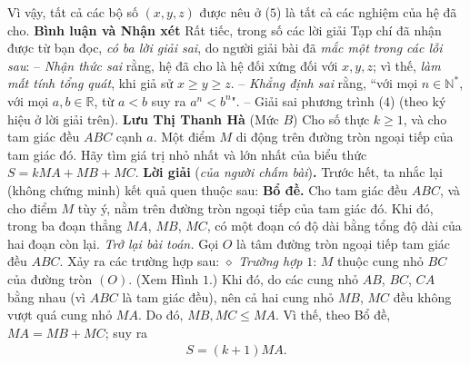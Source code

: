 \begin{multicols}{2}
	\vskip 0.05cm
	Vì vậy, tất cả các bộ số $(x, y, z)$ được nêu ở ($5$) là tất cả các nghiệm của hệ đã cho.
	\vskip 0.05cm
	\textbf{\color{thachthuctoanhoc}Bình luận và Nhận xét}
	\vskip 0.05cm
	Rất tiếc, trong số các lời giải Tạp chí đã nhận được từ bạn đọc, \textit{có ba lời giải sai}, do người giải bài đã \textit{mắc một trong các lỗi sau}:
	\vskip 0.05cm
	-- \textit{Nhận thức sai} rằng, hệ đã cho là hệ đối xứng đối với $x, y, z$; vì thế, \textit{làm mất tính tổng quát}, khi giả sử $x \ge y \ge z$.
	\vskip 0.05cm
	-- \textit{Khẳng định sai} rằng, ``với mọi $n \in \mathbb{N^*}$, với mọi $a,b \in \mathbb{R}$, từ $a < b$ suy ra $a^n < b^n$".
	\vskip 0.05cm
	-- Giải sai phương trình ($4$) (theo ký hiệu ở lời giải trên).
	\vskip 0.05cm
	\hfill \textbf{\color{thachthuctoanhoc}Lưu Thị Thanh Hà}
	\vskip 0.05cm
	{}
	(Mức $B$) Cho số thực $k\ge1$, và cho tam giác đều $ABC$ cạnh $a$. Một điểm $M$ di động trên đường tròn ngoại tiếp của tam giác đó. Hãy tìm giá trị nhỏ nhất và lớn nhất của biểu thức $S=kMA+MB+MC$.
	\vskip 0.05cm
	\textbf{\color{thachthuctoanhoc}Lời giải} (\textit{của người chấm bài})\textbf{\color{thachthuctoanhoc}.}
	\vskip 0.05cm
	Trước hết, ta nhắc lại (không chứng minh) kết quả quen thuộc sau:
	\vskip 0.05cm
	\textbf{\color{thachthuctoanhoc}Bổ đề.} Cho tam giác đều $ABC$, và cho điểm $M$ tùy ý, nằm trên đường tròn ngoại tiếp của tam giác đó. Khi đó, trong ba đoạn thẳng $MA$, $MB$, $MC$, có một đoạn có độ dài bằng tổng độ dài của hai đoạn còn lại.
	\vskip 0.05cm
	\textit{Trở lại bài toán.}
	\vskip 0.05cm
	Gọi $O$ là tâm đường tròn ngoại tiếp tam giác đều $ABC$. Xảy ra các trường hợp sau:
	\vskip 0.05cm
	$\diamond$ \textit{Trường hợp} $1$: $M$ thuộc cung nhỏ $BC$ của đường tròn $(O)$. (Xem Hình $1$.)
	\vskip 0.05cm
	Khi đó, do các cung nhỏ $AB$, $BC$, $CA$ bằng nhau (vì $ABC$ là tam giác đều), nên cả hai cung nhỏ $MB$, $MC$ đều không vượt quá cung nhỏ $MA$. Do đó, $MB, MC \le MA$. Vì thế, theo Bổ đề, $MA = MB + MC$; suy ra
	\begin{align*}
		S = (k + 1)MA.                            \tag{$1$} 
	\end{align*}
	\begin{figure}[H]
		\vspace*{-15pt}
		\centering
		\captionsetup{labelformat= empty, justification=centering}

\end{figure}
\end{multicols}
